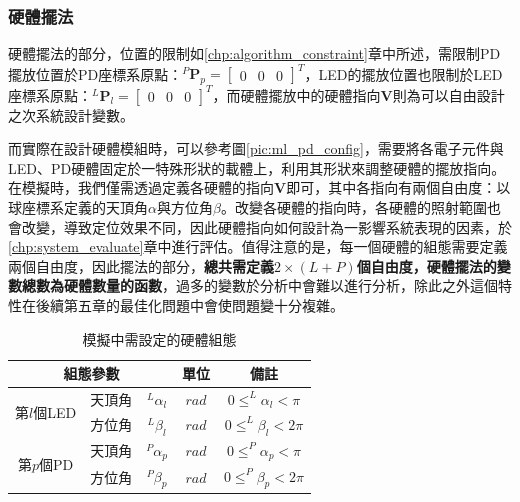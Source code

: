 \subsubsection{硬體擺法}

硬體擺法的部分，位置的限制如\ref{chp:algorithm_constraint}章中所述，需限制PD擺放位置於PD座標系原點：$^P\boldsymbol{P}_p=
\left[\begin{array}{ccc}0&0&0\end{array}\right]^T$，LED的擺放位置也限制於LED座標系原點：$^L\boldsymbol{P}_l=
\left[\begin{array}{ccc}0&0&0\end{array}\right]^T$，而硬體擺放中的硬體指向$\boldsymbol{V}$則為可以自由設計之次系統設計變數。

而實際在設計硬體模組時，可以參考圖\ref{pic:ml_pd_config}，需要將各電子元件與LED、PD硬體固定於一特殊形狀的載體上，利用其形狀來調整硬體的擺放指向。在模擬時，我們僅需透過定義各硬體的指向$\boldsymbol{V}$即可，其中各指向有兩個自由度：以球座標系定義的天頂角$\alpha$與方位角$\beta$。改變各硬體的指向時，各硬體的照射範圍也會改變，導致定位效果不同，因此硬體指向如何設計為一影響系統表現的因素，於\ref{chp:system_evaluate}章中進行評估。值得注意的是，每一個硬體的組態需要定義兩個自由度，因此擺法的部分，\textbf{總共需定義$2\times(L+P)$個自由度，硬體擺法的變數總數為硬體數量的函數}，過多的變數於分析中會難以進行分析，除此之外這個特性在後續第五章的最佳化問題中會使問題變十分複雜。



\begin{table}[htpb]
    \renewcommand{\arraystretch}{1.3}
    \setlength{\arrayrulewidth}{0.15mm}
    \setlength{\doublerulesep}{0.12mm}
    \caption{模擬中需設定的硬體組態}
    \label{tab:para_config}
    \centering
    \begin{tabular}{|c|cc|c|c|}
    \hline
    \multicolumn{3}{|c|}{\textbf{組態參數}}  &\textbf{單位}  &  \textbf{備註}   \\
    \hline
    \multirow{2}{*}{第$l$個LED} 
    & 天頂角 &$^L \alpha_l$ & $rad$ & $0\leq ^L \alpha_l<\pi$ \\
     & 方位角& $^L \beta_l$& $rad$ & $0\leq ^L \beta_l<2\pi$ \\\hline
    \multirow{2}{*}{第$p$個PD} 
    & 天頂角 &$^P \alpha_p$ & $rad$ & $0\leq ^P \alpha_p<\pi$ \\
    & 方位角& $^P \beta_p$& $rad$ & $0\leq ^P \beta_p<2\pi$ \\\hline
    \end{tabular}
\end{table}



